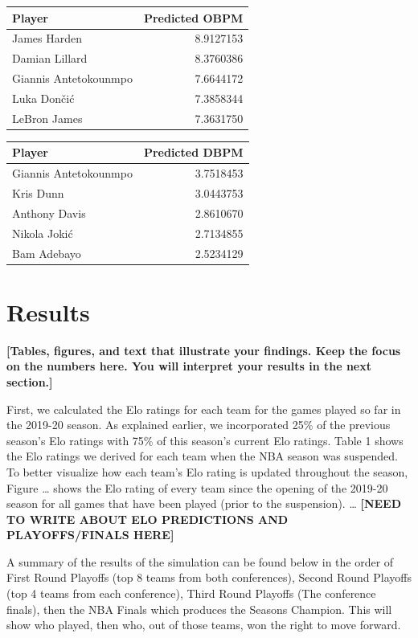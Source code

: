 \documentclass[]{article}
\begin{document}
\begin{table}
\begin{tabular}[t]{l|r}
\hline
Player & Predicted OBPM\\
\hline
James Harden & 8.9127153\\
\hline
Damian Lillard & 8.3760386\\
\hline
Giannis Antetokounmpo & 7.6644172\\
\hline
Luka Dončić & 7.3858344\\
\hline
LeBron James & 7.3631750\\
\hline
\end{tabular}
\centering
\begin{tabular}[t]{l|r}
\hline
Player & Predicted DBPM\\
\hline
Giannis Antetokounmpo & 3.7518453\\
\hline
Kris Dunn & 3.0443753\\
\hline
Anthony Davis & 2.8610670\\
\hline
Nikola Jokić & 2.7134855\\
\hline
Bam Adebayo & 2.5234129\\
\hline
\end{tabular}
\end{table}

\hypertarget{results}{%
\section{Results}\label{results}}

\textbf{{[}Tables, figures, and text that illustrate your findings. Keep
the focus on the numbers here. You will interpret your results in the
next section.{]}}

First, we calculated the Elo ratings for each team for the games played
so far in the 2019-20 season. As explained earlier, we incorporated 25\%
of the previous season's Elo ratings with 75\% of this season's current
Elo ratings. Table 1 shows the Elo ratings we derived for each team when
the NBA season was suspended. To better visualize how each team's Elo
rating is updated throughout the season, Figure \ldots{} shows the Elo
rating of every team since the opening of the 2019-20 season for all
games that have been played (prior to the suspension). \ldots{}
\textbf{{[}NEED TO WRITE ABOUT ELO PREDICTIONS AND PLAYOFFS/FINALS
HERE{]}}

A summary of the results of the simulation can be found below in the
order of First Round Playoffs (top 8 teams from both conferences),
Second Round Playoffs (top 4 teams from each conference), Third Round
Playoffs (The conference finals), then the NBA Finals which produces the
Seasons Champion. This will show who played, then who, out of those
teams, won the right to move forward.
\end{document}
